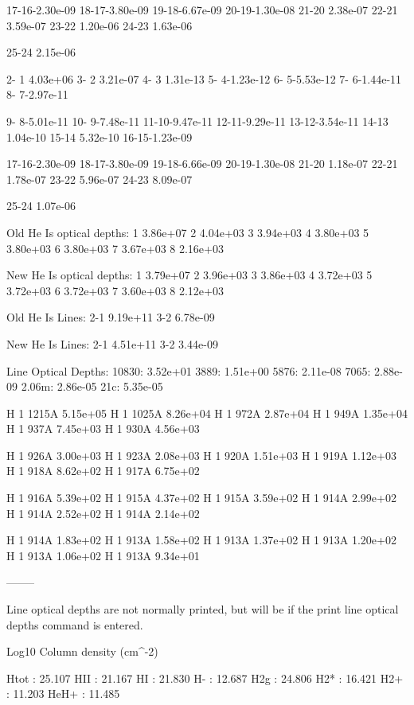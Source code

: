 { 17-16-2.30e-09 18-17-3.80e-09 19-18-6.67e-09 20-19-1.30e-08 21-20 2.38e-07
22-21 3.59e-07 23-22 1.20e-06 24-23 1.63e-06

 25-24 2.15e-06

  2- 1 4.03e+06  3- 2 3.21e-07  4- 3 1.31e-13  5- 4-1.23e-12  6- 5-5.53e-12
7- 6-1.44e-11  8- 7-2.97e-11

  9- 8-5.01e-11 10- 9-7.48e-11 11-10-9.47e-11 12-11-9.29e-11 13-12-3.54e-11
14-13 1.04e-10 15-14 5.32e-10 16-15-1.23e-09

 17-16-2.30e-09 18-17-3.80e-09 19-18-6.66e-09 20-19-1.30e-08 21-20 1.18e-07
22-21 1.78e-07 23-22 5.96e-07 24-23 8.09e-07

 25-24 1.07e-06

 Old He Is optical depths:   1 3.86e+07   2 4.04e+03   3 3.94e+03   4
3.80e+03   5 3.80e+03   6 3.80e+03   7 3.67e+03   8 2.16e+03

 New He Is optical depths:   1 3.79e+07   2 3.96e+03   3 3.86e+03   4
3.72e+03   5 3.72e+03   6 3.72e+03   7 3.60e+03   8 2.12e+03

          Old He Is Lines: 2-1 9.19e+11 3-2 6.78e-09

          New He Is Lines: 2-1 4.51e+11 3-2 3.44e-09



   Line Optical Depths: 10830: 3.52e+01  3889: 1.51e+00    5876: 2.11e-08
7065: 2.88e-09  2.06m: 2.86e-05  21c: 5.35e-05

   H  1 1215A 5.15e+05 H  1 1025A 8.26e+04 H  1  972A 2.87e+04 H  1  949A
1.35e+04 H  1  937A 7.45e+03 H  1  930A 4.56e+03  

   H  1  926A 3.00e+03 H  1  923A 2.08e+03 H  1  920A 1.51e+03 H  1  919A
1.12e+03 H  1  918A 8.62e+02 H  1  917A 6.75e+02  

   H  1  916A 5.39e+02 H  1  915A 4.37e+02 H  1  915A 3.59e+02 H  1  914A
2.99e+02 H  1  914A 2.52e+02 H  1  914A 2.14e+02  

   H  1  914A 1.83e+02 H  1  913A 1.58e+02 H  1  913A 1.37e+02 H  1  913A
1.20e+02 H  1  913A 1.06e+02 H  1  913A 9.34e+01

   --------  

   Line optical depths are not normally printed, but will be if the print
line optical depths command is entered.  

                                                     Log10 Column density
(cm^-2)

   Htot  : 25.107   HII   : 21.167   HI    : 21.830   H-    : 12.687   H2g
: 24.806   H2*   : 16.421   H2+   : 11.203   HeH+  : 11.485

}

